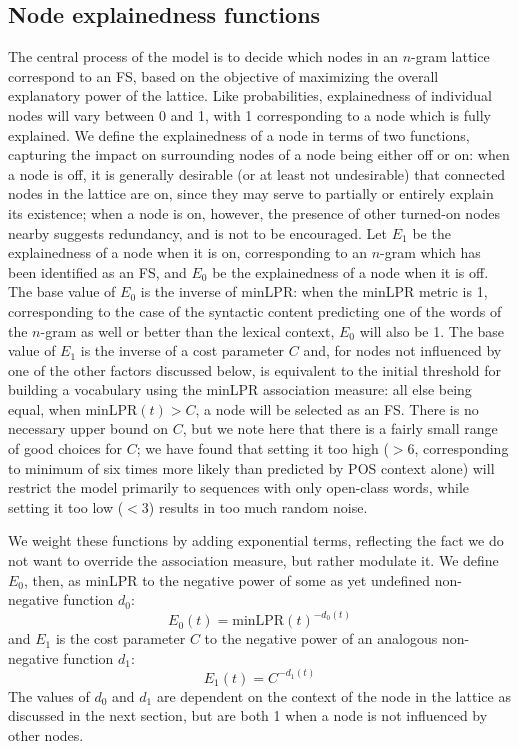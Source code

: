 \documentclass[11pt,letterpaper]{article}
\newcommand{\minLPR}{\ensuremath{\text{minLPR}}}
\begin{document}
\subsection{Node explainedness functions}

The central process of the model is to decide which nodes in an $n$-gram lattice correspond to an FS, based on the objective of maximizing the overall explanatory power of the lattice. Like probabilities, explainedness of individual nodes will vary between 0 and 1, with 1 corresponding to a node which is fully explained. We define the explainedness of a node in terms of two functions, capturing the impact on surrounding nodes of a node being either off or on: when a node is off, it is generally desirable (or at least not undesirable) that connected nodes in the lattice are on, since they may serve to partially or entirely explain its existence; when a node is on, however, the presence of other turned-on nodes nearby suggests redundancy, and is not to be encouraged. Let $E_{1}$ be the explainedness of a node when it is on, corresponding to an $n$-gram which has been identified as an FS, and $E_{0}$ be the explainedness of a node when it is off. The base value of $E_{0}$ is the inverse of minLPR: when the minLPR metric is 1, corresponding to the case of the syntactic content predicting one of the words of the $n$-gram as well or better than the lexical context, $E_{0}$  will also be 1. The base value of $E_{1}$ is the inverse of a cost parameter $C$ and, for nodes not influenced by one of the other factors discussed below, is equivalent to the initial threshold for building a vocabulary using the minLPR association measure: all else being equal, when $\minLPR(t) > C$, a node will be selected as an FS. There is no necessary upper bound on $C$, but we note here that there is a fairly small range of good choices for $C$; we have found that setting it too high ($>6$, corresponding to minimum of six times more likely than predicted by POS context alone) will restrict the model primarily to sequences with only open-class words, while setting it too low ($<3$) results in too much random noise.


We weight these functions by adding exponential terms, reflecting the fact we do not want to override the association measure, but rather modulate it. We define $E_0$, then, as minLPR to the negative power of some as yet undefined non-negative function $d_0$:
\begin{displaymath}
E_0(t) = \minLPR(t)^{-d_0(t)}
\end{displaymath}
and $E_1$ is the cost parameter $C$ to the negative power of an analogous non-negative function $d_1$:
\begin{displaymath}
E_1(t) = C^{-d_1(t)}
\end{displaymath}
The values of $d_0$ and $d_1$ are dependent on the context of the node in the lattice as discussed in the next section, but are both 1 when a node is not influenced by other nodes.
\end{document}
